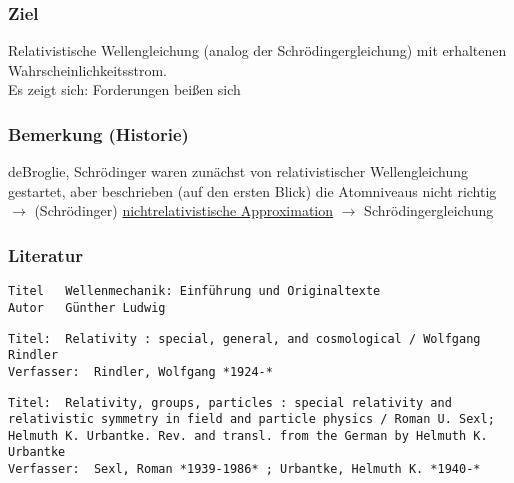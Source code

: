 \documentclass[twoside,a4paper]{scrartcl}
\renewcommand{\1}{\mathds{1}}
\newcommand{\ra}{\rightarrow}
\begin{document}
\subsubsection*{Ziel}
Relativistische Wellengleichung (analog der Schrödingergleichung) mit erhaltenen Wahrscheinlichkeitsstrom.\\
Es zeigt sich: Forderungen beißen sich
\subsubsection*{Bemerkung (Historie)}
deBroglie, Schrödinger waren zunächst von relativistischer Wellengleichung gestartet, aber beschrieben (auf den ersten Blick) die Atomniveaus nicht richtig\\
$\ra$ (Schrödinger) \underline{nichtrelativistische Approximation} $\ra$ Schrödingergleichung
\subsubsection*{Literatur}
\begin{tiny}
\begin{verbatim}
Titel	Wellenmechanik: Einführung und Originaltexte
Autor	Günther Ludwig
\end{verbatim}
\begin{verbatim}
Titel:	Relativity : special, general, and cosmological / Wolfgang Rindler
Verfasser:	Rindler, Wolfgang *1924-*
\end{verbatim}
\begin{verbatim}
Titel:	Relativity, groups, particles : special relativity and relativistic symmetry in field and particle physics / Roman U. Sexl; Helmuth K. Urbantke. Rev. and transl. from the German by Helmuth K. Urbantke
Verfasser:	Sexl, Roman *1939-1986* ; Urbantke, Helmuth K. *1940-*
\end{verbatim}
\end{tiny}
\end{document}
